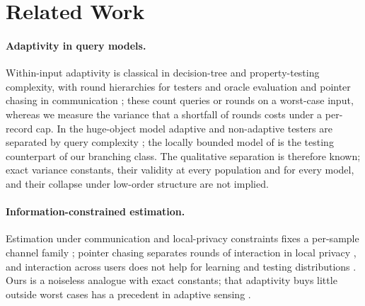 \documentclass{article}
\begin{document}


\section{Related Work}\label{sec:related}
\paragraph{Adaptivity in query models.} Within-input adaptivity is classical in decision-tree and property-testing complexity, with round hierarchies for testers and oracle evaluation \citep{canonne2018,li2026regex} and pointer chasing in communication \citep{nisan1993}; these count queries or rounds on a worst-case input, whereas we measure the variance that a shortfall of rounds costs under a per-record cap. In the huge-object model adaptive and non-adaptive testers are separated by query complexity \citep{goldreich2022,chakraborty2023}; the locally bounded model of \citet{adar2024} is the testing counterpart of our branching class. The qualitative separation is therefore known; exact variance constants, their validity at every population and for every model, and their collapse under low-order structure are not implied.

\paragraph{Information-constrained estimation.} Estimation under communication and local-privacy constraints fixes a per-sample channel family \citep{acharya2019,barnes2020}; pointer chasing separates rounds of interaction in local privacy \citep{joseph2019,joseph2020}, and interaction across users does not help for learning and testing distributions \citep{acharya2022tit,lau2026}. Ours is a noiseless analogue with exact constants; that adaptivity buys little outside worst cases has a precedent in adaptive sensing \citep{ariascastro2013}.
\end{document}
